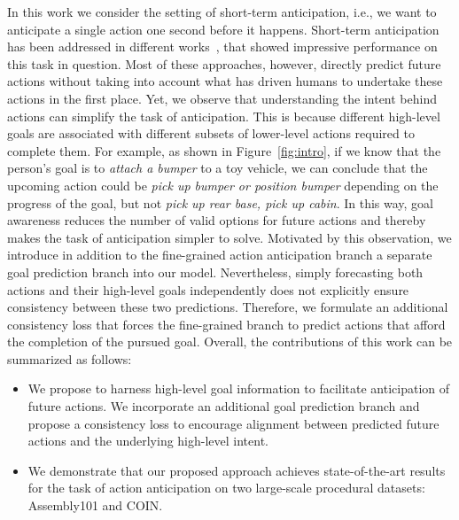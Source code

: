 \documentclass{article}
\begin{document}
In this work we consider the setting of short-term anticipation, i.e., we want to anticipate a single action one second before it happens. Short-term anticipation has been addressed in different works~\cite{furnari2020rulstm, zatsarynna2021MMTCN, zatsarynna_2022_gcpr, nawhal2022anticipatr, memvit2022, girdhar2021anticipative, Gao_2017_BMVC, Vondrick_2016_CVPR, Liu_2020_ECCV, Dessalene_2021_forecasting, Miech_2019_CVPR_Workshops, Jain_2016_ICRA},  
that showed impressive performance on this task in question. Most of these approaches, however, directly predict future actions without taking into account what has driven humans to undertake these actions in the first place. Yet, we observe that understanding the intent behind actions can simplify the task of anticipation. This is because different high-level goals are associated with different subsets of lower-level actions required to complete them. For example, as shown in Figure~\ref{fig:intro}, if we know that the person's goal is to \textit{attach a bumper} to a toy vehicle, we can conclude that the upcoming action could be \textit{pick up bumper or position bumper} depending on the progress of the goal, but not \textit{pick up rear base, pick up cabin}. In this way, goal awareness reduces the number of valid options for future actions and thereby makes the task of anticipation simpler to solve. 
Motivated by this observation, we introduce in addition to the fine-grained action anticipation branch a separate goal prediction branch into our model. 
Nevertheless, simply forecasting both actions and their high-level goals independently does not explicitly ensure consistency between these two predictions. Therefore, we formulate an additional consistency loss that forces the fine-grained branch to predict actions that afford the completion of the pursued goal.
Overall, the contributions of this work can be summarized as follows:
\begin{itemize}
    \vspace{-0.25cm}
    \item We propose to harness high-level goal information to facilitate anticipation of future actions. We incorporate an additional goal prediction branch and propose a consistency loss to encourage alignment between predicted future actions and the underlying high-level intent.
    \vspace{-0.25cm}
    \item We demonstrate that our proposed approach achieves state-of-the-art results for the task of action anticipation on two large-scale procedural datasets: Assembly101 and COIN.
\end{itemize}
\end{document}
